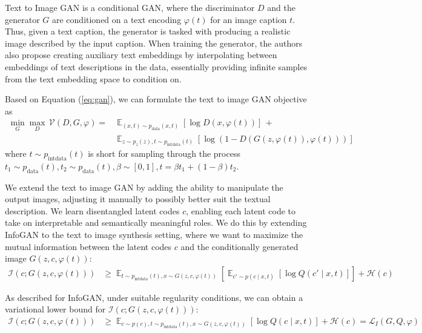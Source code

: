 \documentclass{article}
\DeclareMathOperator*{\E}{\mathbb{E}}
\begin{document}
Text to Image GAN\cite{text2image} is a conditional GAN, where the discriminator $D$ and the generator $G$ are conditioned on a text encoding $\varphi(t)$ for an image caption $t$. Thus, given a text caption, the generator is tasked with producing a realistic image described by the input caption. When training the generator, the authors also propose creating auxiliary text embeddings by interpolating between embeddings of text descriptions in the data, essentially providing infinite samples from the text embedding space to condition on.

Based on Equation (\ref{eq:gan}), we can formulate the text to image GAN objective as
\begin{align}
\min_G \max_D\, \mathcal{V}(D,G, \varphi) =& \E_{(x,t) \sim p_{\text{data}}(x,t)}\left[\log D(x, \varphi(t))\right]\, + \nonumber\\
&\E_{z\sim p_z(z), t\sim p_{\text{intdata}}(t)}\left[\log(1-D(G(z, \varphi(t)), \varphi(t)))\right] \label{eq:t2i}
\end{align}
where $t \sim p_{\text{intdata}}(t)$ is short for sampling through the process $t_1 \sim p_{\text{data}}(t), t_2 \sim p_{\text{data}}(t), \beta \sim [0,1], t = \beta t_1 + (1-\beta) t_2$.

We extend the text to image GAN by adding the ability to manipulate the output images, adjusting it manually to possibly better suit the textual description. We learn disentangled latent codes $c$, enabling each latent code to take on interpretable and semantically meaningful roles. We do this by extending InfoGAN to the text to image synthesis setting, where we want to maximize the mutual information between the latent codes $c$ and the conditionally generated image $G(z,c,\varphi(t))$:
\begin{align}
\mathcal{I}(c;G(z,c,\varphi(t))) &\geq \E_{t\sim p_{\text{intdata}}(t), x\sim G(z,c,\varphi(t))}\left[\E_{c'\sim p(c\mid x,t)}\left[\log Q(c'\mid x,t)\right]\right] + \mathcal{H}(c)
\end{align}

As described for InfoGAN, under suitable regularity conditions, we can obtain a variational lower bound for $\mathcal{I}(c;G(z,c,\varphi(t)))$:
\begin{align}
\mathcal{I}(c;G(z,c, \varphi(t))) &\geq \E_{c\sim p(c), t\sim p_{\text{intdata}}(t), x\sim G(z,c, \varphi(t))}\left[\log Q(c\mid x,t)\right] + \mathcal{H}(c) = \mathcal{L}_I(G,Q,\varphi) \label{eq:t2imiloss}
\end{align}
\end{document}
